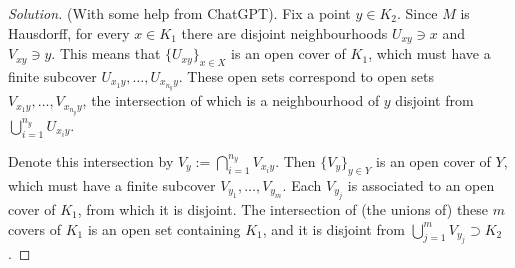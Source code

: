 \begin{proof}[Solution]\leavevmode
	(With some help from {\color{6}ChatGPT}). Fix a point \(y \in K_2\). Since \(M\) is Hausdorff, for every \(x \in K_1\) there are disjoint neighbourhoods \(U_{xy} \ni x\) and \(V_{xy} \ni y\). This means that \( \{U_{xy}\}_{x \in X}\) is an open cover of \(K_1\), which must have a finite subcover \(U_{x_1y},\ldots,U_{x_{n_y}y}\). These open sets correspond to open sets \(V_{x_1y},\ldots,V_{x_{n_y}y}\), {\color{6}the intersection of which is a neighbourhood of $y$ disjoint from \(\bigcup_{i=1}^{n_{y}}U_{x_iy}\).}

Denote this intersection by \(V_y:=\bigcap_{i=1}^{n_{y}}V_{x_iy}\). Then \(\{V_y\}_{y \in Y}\) is an open cover of \(Y\), which must have a finite subcover \(V_{y_1},\ldots,V_{y_m}\). Each \(V_{y_j}\) is associated to an open cover of \(K_1\), from which it is disjoint. The intersection of (the unions of) these \(m\) covers of \(K_1\) is an open set containing \(K_1\), and it is disjoint from \(\bigcup_{j=1}^mV_{y_j} \supset K_2\).
\end{proof}
\iffalse
